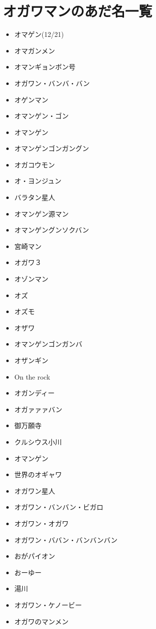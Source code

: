 \section{オガワマンのあだ名一覧}
\begin{itemize}
\item オマゲン(12/21)
\item オマガンメン
\item オマンギョンボン号
\item オガワン・バンバ・バン
\item オゲンマン
\item オマンゲン・ゴン
\item オマンゲン
\item オマンゲンゴンガングン
\item オガコウモン
\item オ・ヨンジュン
\item バラタン星人
\item オマンゲン源マン
\item オマンゲングンソクバン
\item 宮崎マン
\item オガワ３
\item オゾンマン
\item オズ
\item オズモ
\item オザワ
\item オマンゲンゴンガンバ
\item オザンギン
\item On the rock
\item オガンディー
\item オガァァァバン
\item 御万願寺
\item クルシウス小川
\item オマンゲン
\item 世界のオギャワ
\item オガワン星人
\item オガワン・バンバン・ビガロ
\item オガワン・オガワ
\item オガワン・ババン・バンバンバン
\item おがパイオン
\item おーゆー
\item 湯川
\item オガワン・ケノービー
\item オガワのマンメン
\end{itemize}

